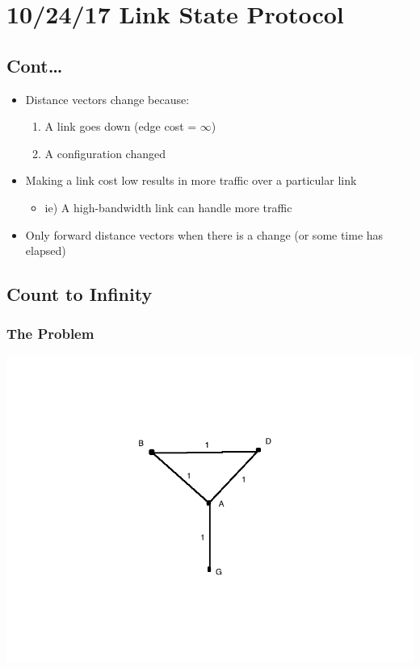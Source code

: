 \documentclass[11pt]{article}
\begin{document}
\section{10/24/17  Link State Protocol}
\label{sec:orgheadline84}
\subsection{Cont\ldots{}}
\label{sec:orgheadline77}
\begin{itemize}
\item Distance vectors change because:
\begin{enumerate}
\item A link goes down (edge cost = \(\infty\))
\item A configuration changed
\end{enumerate}

\item Making a link cost low results in more traffic over a particular link
\begin{itemize}
\item ie) A high-bandwidth link can handle more traffic
\end{itemize}
\item Only forward distance vectors when there is a change (or some time
has elapsed)
\end{itemize}

\subsection{Count to Infinity}
\label{sec:orgheadline81}

\subsubsection{The Problem}
\label{sec:orgheadline78}
\includegraphics[width=.9\linewidth]{diagrams/counttoinfty.png}
\end{document}
